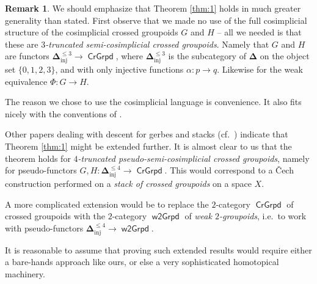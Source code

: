 \documentclass[a4paper,10pt]{amsart}
\theoremstyle{definition}
\newtheorem{rem}[equation]{Remark}
\numberwithin{equation}{section}
\newcommand{\cat}[1]{\operatorname{\mathsf{#1}}}
\newcommand{\mrm}[1]{\mathrm{#1}}
\newcommand{\bsym}[1]{\boldsymbol{#1}}
\newcommand{\al}{\alpha}
\begin{document}
\begin{rem} \label{rem:15}
We should emphasize that Theorem \ref{thm:1} holds in much greater
generality than stated. First observe that we made no use of the full
cosimplicial structure of the cosimplicial crossed groupoids $G$ and 
$H$ -- all we needed is that these are {\em $3$-truncated
semi-cosimplicial crossed groupoids}. Namely that $G$ and 
$H$ are functors 
$\bsym{\Delta}^{\leq 3}_{\mrm{inj}} \to \cat{CrGrpd}$, where
$\bsym{\Delta}^{\leq 3}_{\mrm{inj}}$ is the subcategory of 
$\bsym{\Delta}$ on the object set $\{ 0, 1, 2, 3 \}$, and with only injective 
functions $\al : p \to q$. Likewise for the weak equivalence 
$\Phi : G \to H$.

The reason  we chose to use the cosimplicial language is convenience. It
also fits nicely with the conventions of \cite{Ye1}. 

Other papers dealing with descent for gerbes and stacks (cf.\ \cite{Br1, Br2,
DP}) indicate that Theorem \ref{thm:1} might be extended further. It is almost
clear to us that the theorem holds for {\em $4$-truncated
pseudo-semi-cosimplicial crossed groupoids}, namely for pseudo-functors
$G, H : \bsym{\Delta}^{\leq 4}_{\mrm{inj}} \to \cat{CrGrpd}$.
This would correspond to a \v{C}ech construction performed on a {\em stack
of crossed groupoids} on a space $X$. 

A more complicated extension would be to replace the $2$-category 
$\cat{CrGrpd}$ of crossed groupoids with the $2$-category
$\cat{w2Grpd}$  of {\em weak $2$-groupoids}, i.e.\ to work with pseudo-functors
$\bsym{\Delta}^{\leq 4}_{\mrm{inj}} \to \cat{w2Grpd}$.

It is reasonable to assume that proving such extended results would require
either a bare-hands approach like ours, or else a very sophisticated
homotopical machinery.
\end{rem}
\end{document}
